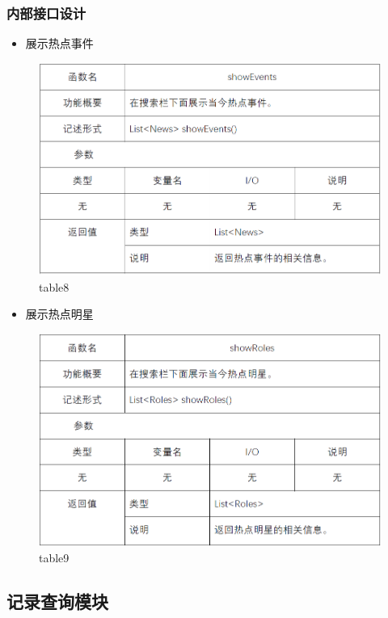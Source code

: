 \subsubsection{内部接口设计}
\begin{itemize}
	\item 展示热点事件
\end{itemize}
\begin{figure}[!htbp]
	\centering
	\includegraphics[scale=0.7]{image/b8.png} %
	\caption{table8} %
\end{figure}
\begin{itemize}
	\item 展示热点明星
\end{itemize}
\begin{figure}[!htbp]
	\centering
	\includegraphics[scale=0.7]{image/b9.png} %
	\caption{table9} %
\end{figure}
\subsection{记录查询模块}
